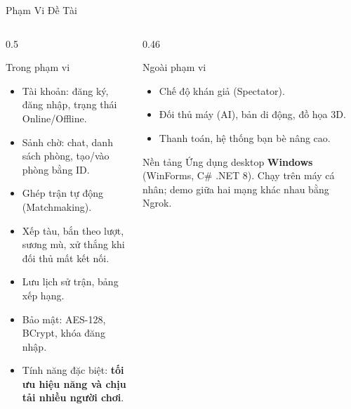 \begin{frame}{Phạm Vi Đề Tài}
  \begin{columns}[T]
    \begin{column}{0.5\textwidth}
      \begin{block}{Trong phạm vi}
        \begin{itemize}
          \item Tài khoản: đăng ký, đăng nhập, trạng thái Online/Offline.
          \item Sảnh chờ: chat, danh sách phòng, tạo/vào phòng bằng ID.
          \item Ghép trận tự động (Matchmaking).
          \item Xếp tàu, bắn theo lượt, sương mù, xử thắng khi đối thủ mất kết nối.
          \item Lưu lịch sử trận, bảng xếp hạng.
          \item Bảo mật: AES-128, BCrypt, khóa đăng nhập.
          \item Tính năng đặc biệt: \textbf{tối ưu hiệu năng và chịu tải nhiều người chơi}.
        \end{itemize}
      \end{block}
    \end{column}
    \begin{column}{0.46\textwidth}
      \begin{alertblock}{Ngoài phạm vi}
        \begin{itemize}
          \item Chế độ khán giả (Spectator).
          \item Đối thủ máy (AI), bản di động, đồ họa 3D.
          \item Thanh toán, hệ thống bạn bè nâng cao.
        \end{itemize}
      \end{alertblock}
      \begin{exampleblock}{Nền tảng}
        Ứng dụng desktop \textbf{Windows} (WinForms, C\# .NET 8). Chạy trên máy cá nhân; demo giữa hai mạng khác nhau bằng Ngrok.
      \end{exampleblock}
    \end{column}
  \end{columns}
\end{frame}

\newcommand{\tickDone}{\textcolor{green!50!black}{$\checkmark$}}
\newcommand{\tickHalf}{\textcolor{orange!80!black}{$\circ$}}
\newcommand{\tickNone}{\textcolor{gray}{$-$}}

